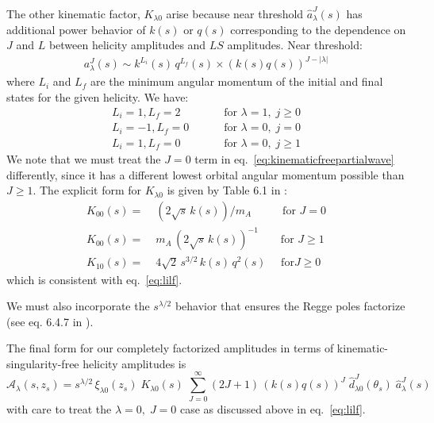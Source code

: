 \documentclass[10pt, aps,prd,amsmath,amssymb,superscriptaddress,onecolumn,
nofootinbib,showpacs,preprintnumbers]{revtex4-1}
\begin{document}
The other kinematic factor, \(K_{\lambda0}\) arise  because near threshold \(\hat{a}_\lambda^J(s)\) has additional power behavior of \(k(s)\) or \(q(s)\) corresponding to the dependence on \(J\) and \(L\) between helicity amplitudes and \(LS\) amplitudes. Near threshold:
  \begin{gather}
    a^J_\lambda(s) \sim k^{L_i}(s) \, q^{L_f}(s) \times (k(s)q(s))^{J- |\lambda|}
  \end{gather}
where \(L_i\) and \(L_f\) are the minimum angular momentum of the initial and final states for the given helicity. We have:
  \begin{align}
      L_i = 1 , L_f = 2& \qquad  \text{ for } \lambda = 1, \; j \geq 0 \nonumber \\
      L_i = -1, L_f = 0 &\qquad  \text{ for } \lambda = 0, \; j = 0  \label{eq:lilf} \\
      L_i = 1, L_f = 0 &\qquad  \text{ for } \lambda = 0, \;  j  \geq 1 \nonumber
  \end{align}
We note that we must treat the \(J=0\) term in eq.~\ref{eq:kinematicfreepartialwave} differently, since it has a different lowest orbital angular momentum possible than \(J\geq 1\). The explicit form for \(K_{\lambda0}\) is given by Table 6.1 in \cite{Collins}:
  \begin{align}
    \label{eq:k-factor}
    K_{00}(s) =& \;  ( 2\sqrt{s} \, k(s))/m_A \qquad \; \, \text{  for } J=0 \nonumber \\
    K_{00 }(s) =& \; m_A \, ( 2\sqrt{s} \, k(s))^{-1} \qquad \text{for } J\geq 1\\ \nonumber
    K_{10}(s) =& \; 4 \sqrt{2} \,  s^{3/2} \, k(s) \, q^2(s)  \quad \text{ for} J\geq 0
  \end{align}
which is consistent with eq.~\ref{eq:lilf}.

We must also incorporate the \(s^{\lambda/2}\) behavior that ensures the Regge poles factorize (see eq. 6.4.7 in \cite{Collins}).

The final form for our completely factorized amplitudes in terms of kinematic-singularity-free helicity amplitudes is
  \begin{equation}
    \mathcal{A}_\lambda(s,z_s) = s^{\lambda/2} \, \xi_{\lambda0}(z_s) \; K_{\lambda0}(s) \; \sum_{J=0}^\infty (2J+1) \, (k(s)q(s))^J \; \hat{d}^J_{\lambda0}(\theta_s) \; \hat{a}^J_\lambda(s)
  \end{equation}
with care to treat the \(\lambda =0, \;  J=0\) case as discussed above in eq.~\ref{eq:lilf}.
\end{document}
